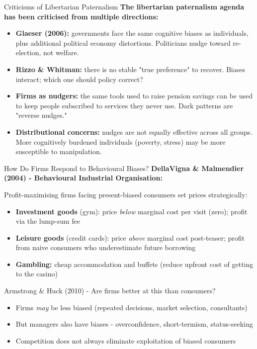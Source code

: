 \documentclass[10pt]{beamer}
\begin{document}
\begin{frame}{Criticisms of Libertarian Paternalism}
\textbf{The libertarian paternalism agenda has been criticised from multiple directions:}


\begin{itemize}
\item \textbf{Glaeser (2006):} governments face the same cognitive biases as individuals, plus additional political economy distortions. Politicians nudge toward re-election, not welfare.


\item \textbf{Rizzo \& Whitman:} there is no stable "true preference" to recover. Biases interact; which one should policy correct?


\item \textbf{Firms as nudgers:} the same tools used to raise pension savings can be used to keep people subscribed to services they never use. Dark patterns are "reverse nudges."


\item \textbf{Distributional concerns:} nudges are not equally effective across all groups. More cognitively burdened individuals (poverty, stress) may be more susceptible to manipulation.
\end{itemize}
\end{frame}


\begin{frame}[allowframebreaks]{How Do Firms Respond to Behavioural Biases?}
\textbf{DellaVigna \& Malmendier (2004) - Behavioural Industrial Organisation:}

Profit-maximising firms facing present-biased consumers set prices strategically:
\begin{itemize}
\item \textbf{Investment goods} (gym): price \emph{below} marginal cost per visit (zero); profit via the lump-sum fee
\item \textbf{Leisure goods} (credit cards): price \emph{above} marginal cost post-teaser; profit from naive consumers who underestimate future borrowing
\item \textbf{Gambling:} cheap accommodation and buffets (reduce upfront cost of getting to the casino)
\end{itemize}


\alert{Armstrong \& Huck (2010) - Are firms better at this than consumers?}
\begin{itemize}
\item Firms \emph{may} be less biased (repeated decisions, market selection, consultants)
\item But managers also have biases - overconfidence, short-termism, status-seeking
\item Competition does not always eliminate exploitation of biased consumers
\end{itemize}
\end{frame}
\end{document}
